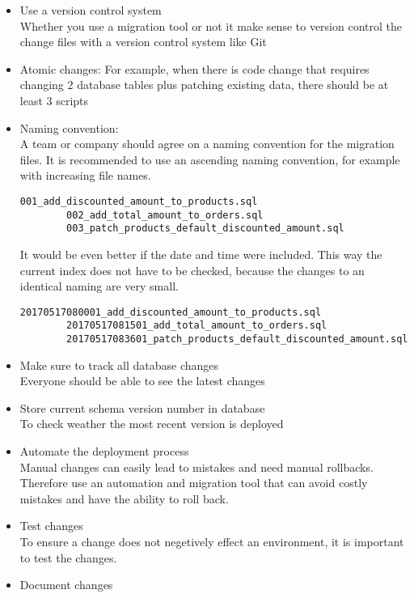 \begin{itemize}
	\item Use a version control system\\
	Whether you use a migration tool or not it make sense to version control the change files with a version control system like Git
	\item Atomic changes: For example, when there is code change that requires changing 2 database tables plus patching existing data, there should be at least 3 scripts
	\item Naming convention: \\
	A team or company should agree on a naming convention for the migration files. It is recommended to use an ascending naming convention, for example with increasing file names.
	\begin{lstlisting}[caption=Increasing file names]
		001_add_discounted_amount_to_products.sql
		002_add_total_amount_to_orders.sql
		003_patch_products_default_discounted_amount.sql
	\end{lstlisting}
	
	It would be even better if the date and time were included. This way the current index does not have to be checked, because the changes to an identical naming are very small.
	\begin{lstlisting}[caption=Timestamps]
		20170517080001_add_discounted_amount_to_products.sql
		20170517081501_add_total_amount_to_orders.sql
		20170517083601_patch_products_default_discounted_amount.sql
	\end{lstlisting}
	\item Make sure to track all database changes\\
	Everyone should be able to see the latest changes
	\item Store current schema version number in database\\
	To check weather the most recent version is deployed
	\item Automate the deployment process\\
	Manual changes can easily lead to mistakes and need manual rollbacks. Therefore use an automation and migration tool that can avoid costly mistakes and have the ability to roll back.
	\item Test changes\\
	To ensure a change does not negetively effect an environment, it is important to test the changes.
	\item Document changes 
\end{itemize}


